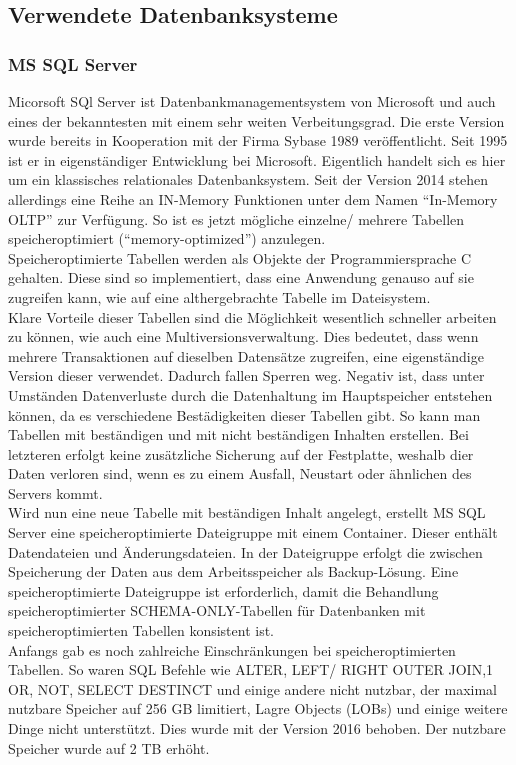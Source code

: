 \documentclass[a4paper, 12pt]{scrartcl}
\begin{document}
\subsection{Verwendete Datenbanksysteme}
\subsubsection{MS SQL Server}
Micorsoft SQl Server ist Datenbankmanagementsystem von Microsoft und auch eines der bekanntesten mit einem sehr weiten Verbeitungsgrad. Die erste Version wurde bereits in Kooperation mit der Firma Sybase 1989 veröffentlicht. Seit 1995 ist er in eigenständiger Entwicklung bei Microsoft. Eigentlich handelt sich es hier um ein klassisches relationales Datenbanksystem. Seit der Version 2014 stehen allerdings eine Reihe an IN-Memory Funktionen unter dem Namen "`In-Memory OLTP"' zur Verfügung. So ist es jetzt mögliche einzelne/ mehrere Tabellen speicheroptimiert ("`memory-optimized"') anzulegen. \\ Speicheroptimierte Tabellen werden als Objekte der Programmiersprache C gehalten. Diese sind so implementiert, dass eine Anwendung genauso auf sie zugreifen kann, wie auf eine althergebrachte Tabelle im Dateisystem.\\ Klare Vorteile dieser Tabellen sind die Möglichkeit wesentlich schneller arbeiten zu können, wie auch eine Multiversionsverwaltung. Dies bedeutet, dass wenn mehrere Transaktionen auf dieselben Datensätze zugreifen, eine eigenständige Version dieser verwendet. Dadurch fallen Sperren weg. Negativ ist, dass unter Umständen Datenverluste durch die Datenhaltung im Hauptspeicher entstehen können, da es verschiedene Bestädigkeiten dieser Tabellen gibt. So kann man Tabellen mit beständigen und mit nicht beständigen Inhalten erstellen. Bei letzteren erfolgt keine zusätzliche Sicherung auf der Festplatte, weshalb dier Daten verloren sind, wenn es zu einem Ausfall, Neustart oder ähnlichen des Servers kommt.\\ Wird nun eine neue Tabelle mit beständigen Inhalt angelegt, erstellt MS SQL Server eine speicheroptimierte Dateigruppe mit einem Container. Dieser enthält Datendateien und Änderungsdateien. In der Dateigruppe erfolgt die zwischen Speicherung der Daten aus dem Arbeitsspeicher als Backup-Lösung. Eine speicheroptimierte Dateigruppe ist erforderlich, damit die Behandlung speicheroptimierter SCHEMA-ONLY-Tabellen für Datenbanken mit speicheroptimierten Tabellen konsistent ist. \\ Anfangs gab es noch zahlreiche Einschränkungen bei speicheroptimierten Tabellen. So waren SQL Befehle wie ALTER, LEFT/ RIGHT OUTER JOIN,1 OR, NOT, SELECT DESTINCT und einige andere nicht nutzbar, der maximal nutzbare Speicher auf 256 GB limitiert, Lagre Objects (LOBs) und einige weitere Dinge nicht unterstützt. Dies wurde mit der Version 2016 behoben. Der nutzbare Speicher wurde auf 2 TB erhöht. 
 
\end{document}
